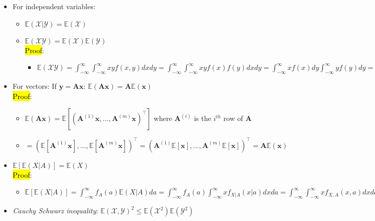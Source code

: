 \begin{itemize}
    \item For independent variables: 
    \begin{itemize}
        \item $\mathbb{E}(\mathcal{X}|\mathcal{Y}) = \mathbb{E}(\mathcal{X})$
        \item $\mathbb{E}(\mathcal{X}\mathcal{Y})=\mathbb{E}(\mathcal{X})\mathbb{E}(\mathcal{Y})$\\
        \hl{Proof}:
        \begin{itemize}
            \item $\mathbb{E}(\mathcal{X}\mathcal{Y}) = \int_{-\infty}^\infty \int_{-\infty}^\infty xy f(x,y) dxdy = \int_{-\infty}^\infty \int_{-\infty}^\infty xy f(x)f(y) dxdy = \int_{-\infty}^\infty xf(x) dy \int_{-\infty}^\infty y f(y) dy = \mathbb{E}(\mathcal{X})\mathbb{E}(\mathcal{Y})$
        \end{itemize}
    \end{itemize}
    \item For vectors: If $\boldsymbol{y} = \boldsymbol{A}\boldsymbol{x}$: $\mathbb{E}(\boldsymbol{A}\boldsymbol{x})=\boldsymbol{A}\mathbb{E}(\boldsymbol{x})$\\
    \hl{Proof}:
    \begin{itemize}
        \item $\mathbb{E}(\boldsymbol{A}\boldsymbol{x})
        = \mathbb{E}[(\boldsymbol{A}^{(1)}\boldsymbol{x}, ..., \boldsymbol{A}^{(m)}\boldsymbol{x})^\intercal]
        $ where $\boldsymbol{A}^{(i)}$ is the $i^{th}$ row of $\boldsymbol{A}$
        \item $= (\mathbb{E}[\boldsymbol{A}^{(1)}\boldsymbol{x}], ..., \mathbb{E}[\boldsymbol{A}^{(m)}\boldsymbol{x}])^\intercal = (\boldsymbol{A}^{(1)}\mathbb{E}[\boldsymbol{x}], ..., \boldsymbol{A}^{(m)}\mathbb{E}[\boldsymbol{x}])^\intercal = \boldsymbol{A}\mathbb{E}(\boldsymbol{x})$
    \end{itemize}
    \item $\mathbb{E}[\mathbb{E}(X | A)] = \mathbb{E}(X)$\\
    \hl{Proof}:
    \begin{itemize}
        \item $\mathbb{E}[\mathbb{E}(X | A)] = \int_{-\infty}^{\infty} f_A(a) \mathbb{E}(X | A) da = \int_{-\infty}^{\infty} f_A(a) \int_{-\infty}^{\infty} x f_{X|A}(x|a) dx da = \int_{-\infty}^{\infty} \int_{-\infty}^{\infty} x f_{X,A}(x,a) dx da = \int_{-\infty}^{\infty} x \int_{-\infty}^{\infty} f_{X,A}(x,a) da dx = \int_{-\infty}^{\infty} x f_{X}(x) dx = \mathbb{E}(X)$
    \end{itemize}
    \item \emph{Cauchy Schwarz inequality}: $\mathbb{E}(\mathcal{X},\mathcal{Y})^2 \leq \mathbb{E}(\mathcal{X}^2)\mathbb{E}(\mathcal{Y}^2)$
\end{itemize}

